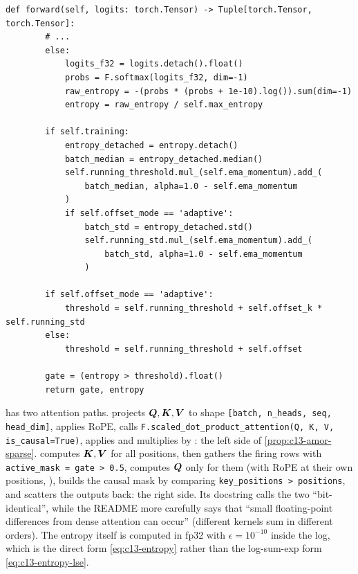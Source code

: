 \begin{lstlisting}[caption={Excerpt from \texttt{repos/HaoranZhengRaul\_\_AMOR/amor.py} (\texttt{EntropyGate.forward})},label={lst:c13-amor-gate}]
    def forward(self, logits: torch.Tensor) -> Tuple[torch.Tensor, torch.Tensor]:
        # ...
        else:
            logits_f32 = logits.detach().float()
            probs = F.softmax(logits_f32, dim=-1)
            raw_entropy = -(probs * (probs + 1e-10).log()).sum(dim=-1)
            entropy = raw_entropy / self.max_entropy

        if self.training:
            entropy_detached = entropy.detach()
            batch_median = entropy_detached.median()
            self.running_threshold.mul_(self.ema_momentum).add_(
                batch_median, alpha=1.0 - self.ema_momentum
            )
            if self.offset_mode == 'adaptive':
                batch_std = entropy_detached.std()
                self.running_std.mul_(self.ema_momentum).add_(
                    batch_std, alpha=1.0 - self.ema_momentum
                )

        if self.offset_mode == 'adaptive':
            threshold = self.running_threshold + self.offset_k * self.running_std
        else:
            threshold = self.running_threshold + self.offset

        gate = (entropy > threshold).float()
        return gate, entropy
\end{lstlisting}

\begin{implnote}[title={In the code: dense-masked and true-sparse attention}]
 has two attention paths.  projects $\bm{Q},\bm{K},\bm{V}$ to
shape \texttt{[batch, n\_heads, seq, head\_dim]}, applies RoPE, calls
\texttt{F.scaled\_dot\_product\_attention(Q, K, V, is\_causal=True)}, applies  and multiplies
by : the left side of \cref{prop:c13-amor-sparse}.
 computes $\bm{K},\bm{V}$ for all positions, then gathers the firing rows with
\texttt{active\_mask = gate > 0.5}, computes $\bm{Q}$ only for them (with RoPE at their own positions,
), builds the causal mask by comparing \texttt{key\_positions > positions},
and scatters the outputs back: the right side. Its docstring calls the two ``bit-identical'', while the
README more carefully says that ``small floating-point differences from dense attention can occur''
(different kernels sum in different orders). The entropy itself is computed in fp32 with
$\epsilon=10^{-10}$ inside the log, which is the direct form \eqref{eq:c13-entropy} rather than the
log-sum-exp form \eqref{eq:c13-entropy-lse}.
\end{implnote}

